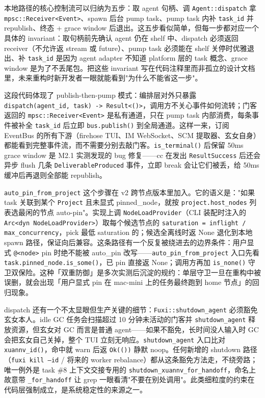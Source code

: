 本地路径的核心控制流可以归纳为五步：取 agent 句柄、调 \texttt{Agent::dispatch} 拿 \texttt{mpsc::Receiver<Event>}、spawn 后台 pump task、pump task 内补 \texttt{task\_id} 并 republish、终态 + grace window 后退出。这五步看似简单，但每一步都对应一个具体的 invariant：取句柄前先确认 agent 仍在 shelf 中、dispatch 必须返回 receiver（不允许返 stream 或 future）、pump task 必须能在 shelf 关停时优雅退出、补 \texttt{task\_id} 是因为 agent adapter 不知道 platform 层的 task 概念、grace window 是为了不丢尾包。把这些 invariant 写在代码注释里而非孤立的设计文档里，未来重构时新开发者一眼就能看到"为什么不能省这一步"。

这段代码体现了 publish-then-pump 模式：编排层对外只暴露 \texttt{dispatch(agent\_id, task) -> Result<()>}，调用方不关心事件如何流转；门客返回的 \texttt{mpsc::Receiver<Event>} 是私有通道，只在 pump task 内部消费，每条事件被补全 \texttt{task\_id} 后立即 \texttt{bus.publish()} 到全局通道。这样一来，订阅 EventBus 的所有下游（firehose TUI、IM WebSocket、SCM 提取器、玄女自身）都能看到完整事件流，而不需要分别去敲门客。\texttt{is\_terminal()} 后保留 50ms grace window 是 M2.1 实测发现的 bug 修复——cc 在发出 \texttt{ResultSuccess} 后还会异步 flush 几条 \texttt{DeliverableProduced} 事件，立即 break 会让它们被丢，给 50ms 缓冲后再退则全部能 republish。

\texttt{auto\_pin\_from\_project} 这个步骤在 v2 跨节点版本里加入。它的语义是："如果 task 关联到某个 \texttt{Project} 且未显式 pinned\_node，就按 \texttt{project.host\_nodes} 列表选最闲的节点 auto-pin"。实现上调 \texttt{NodeLoadProvider}（CLI 装配时注入的 \texttt{Arc<dyn NodeLoadProvider>}）取每个候选节点的 \texttt{saturation = inflight / max\_concurrency}，pick 最低 saturation 的；候选全离线时返 None 退化到本地 spawn 路径，保证向后兼容。这条路径有一个反复被绕进去的边界条件：用户显式 \texttt{@<node>} pin 时绝不能被 auto\_pin 改写——\texttt{auto\_pin\_from\_project} 入口先看 \texttt{task.pinned\_node.is\_some()}，已 pin 直接返 None；调用方再加 \texttt{is\_none()} 守卫双保险。这种「双重防御」是多次实测后沉淀的规约：单层守卫一旦在重构中被误删，就会出现「用户显式 pin 在 mac-mini 上的任务最终跑到 home 节点」的回归现象。

dispatch 还有一个不太显眼但生产关键的细节：\texttt{Fuxi::shutdown\_agent} 必须豁免玄女本人。idle GC 任务会扫描超过 10 分钟未活动的门客并 \texttt{shutdown\_agent} 释放资源，但玄女对 GC 而言是普通 agent——如果不豁免，长时间没人输入时 GC 会把玄女自己关掉，整个 TUI 立刻无响应。\texttt{shutdown\_agent} 入口比对 \texttt{xuannv\_id()}，命中就 warn 后返 \texttt{Ok(())} 静默 noop。任何新增的 shutdown 路径（\texttt{fuxi kill --id} / 将来的 worker rebalance）都从这条豁免方法走，不绕旁路；唯一例外是 task \#8 上下文交接专用的 \texttt{shutdown\_xuannv\_for\_handoff}，命名上故意带 \texttt{\_for\_handoff} 让 grep 一眼看清"不要在别处调用"。此类细粒度的约束在代码层强制成立，是系统稳定性的来源之一。

